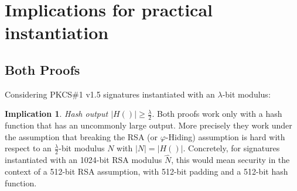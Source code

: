 \documentclass[]{final_report}
\theoremstyle{definition}
\newtheorem{implication}{Implication}
\begin{document}

\section{Implications for practical instantiation}

\subsection{Both Proofs}
Considering PKCS\#1 v1.5 signatures instantiated with an $\lambda$-bit modulus:
\begin{implication} \textit{Hash output $\displaystyle|H()| \ge \displaystyle\frac{\lambda}{2}$}.
\label{IMP:HASH}
Both proofs work only with a hash function that has an uncommonly large output. More precisely they work under the assumption that breaking the RSA (or $\varphi$-Hiding) assumption is hard with respect to an $\frac{\lambda}{2}$-bit modulus $N$ with $|N| = |H()|$. Concretely, for signatures instantiated with an 1024-bit RSA modulus $\displaystyle\hat{N}$, this would mean security in the context of a 512-bit RSA assumption, with 512-bit padding and a 512-bit hash function.
\end{implication}
\end{document}
